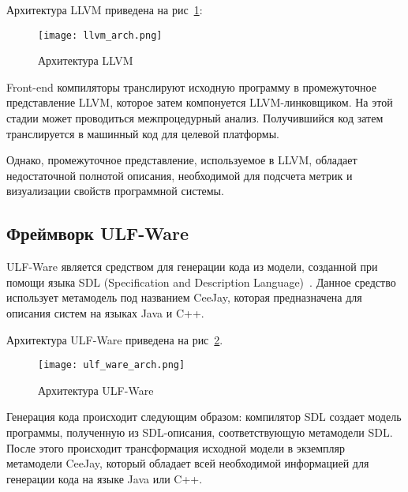 Архитектура LLVM приведена на рис~\ref{fig:llvm_arch}:

\begin{figure}[ht!]
    \begin{center}
        \texttt{[image: llvm\_arch.png]}
    \end{center}
    \caption{Архитектура LLVM}
    \label{fig:llvm_arch}
\end{figure}

Front-end компиляторы транслируют исходную программу в промежуточное
представление LLVM, которое затем компонуется LLVM-линковщиком. На этой стадии
может проводиться межпроцедурный анализ. Получившийся код затем транслируется
в машинный код для целевой платформы.

Однако, промежуточное представление, используемое в LLVM, обладает
недостаточной полнотой описания, необходимой для подсчета метрик и визуализации
свойств программной системы.

\subsection{Фреймворк ULF-Ware}



ULF-Ware является средством для генерации кода из модели, созданной при помощи
языка SDL (Specification and Description Language)~\cite{metamodeling}. Данное
средство использует метамодель под названием CeeJay, которая предназначена для
описания систем на языках Java и C++.

Архитектура ULF-Ware приведена на рис~\ref{fig:ulf_ware_arch}.

\begin{figure}[htbc!]
    \begin{center}
        \texttt{[image: ulf\_ware\_arch.png]}
    \end{center}
    \caption{Архитектура ULF-Ware}
    \label{fig:ulf_ware_arch}
\end{figure}

Генерация кода происходит следующим образом: компилятор SDL создает модель
программы, полученную из SDL-описания, соответствующую метамодели SDL. После
этого происходит трансформация исходной модели в экземпляр метамодели CeeJay,
который обладает всей необходимой информацией для генерации кода на языке Java
или C++.

